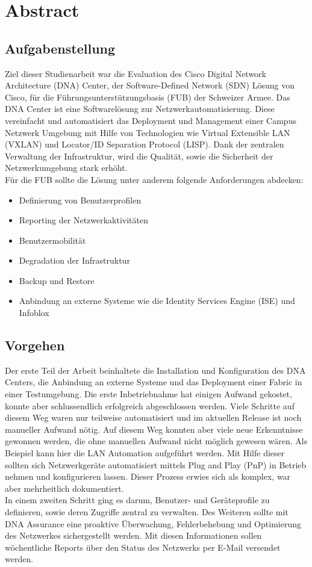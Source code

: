 \section{Abstract} 

\subsection{Aufgabenstellung} \label{Abstract}
Ziel dieser Studienarbeit war die Evaluation des Cisco Digital Network Architecture (DNA) Center, der Software-Defined Network (SDN) Lösung von Cisco, für die Führungsunterstützungsbasis (FUB) der Schweizer Armee. Das DNA Center ist eine Softwarelösung zur Netzwerkautomatisierung. Diese vereinfacht und automatisiert das Deployment und Management einer Campus Netzwerk Umgebung mit Hilfe von Technologien wie Virtual Extensible LAN (VXLAN) und Locator/ID Separation Protocol (LISP). Dank der zentralen Verwaltung der Infrastruktur, wird die Qualität, sowie die Sicherheit der Netzwerkumgebung stark erhöht.\\
Für die FUB sollte die Lösung unter anderem folgende Anforderungen abdecken:
\begin{itemize}
	\item Definierung von Benutzerprofilen
	\item Reporting der Netzwerkaktivitäten
	\item Benutzermobilität
	\item Degradation der Infrastruktur
	\item Backup und Restore
	\item Anbindung an externe Systeme wie die Identity Services Engine (ISE) und Infoblox
\end{itemize}

\subsection{Vorgehen}
Der erste Teil der Arbeit beinhaltete die Installation und Konfiguration des DNA Centers, die Anbindung an externe Systeme und das Deployment einer Fabric in einer Testumgebung. Die erste Inbetriebnahme hat einigen Aufwand gekostet, konnte aber schlussendlich erfolgreich abgeschlossen werden. Viele Schritte auf diesem Weg waren nur teilweise automatisiert und im aktuellen Release ist noch manueller Aufwand nötig. Auf diesem Weg konnten aber viele neue Erkenntnisse gewonnen werden, die ohne manuellen Aufwand nicht möglich gewesen wären. Als Beispiel kann hier die LAN Automation aufgeführt werden. Mit Hilfe dieser sollten sich Netzwerkgeräte automatisiert mittels Plug and Play (PnP) in Betrieb nehmen und konfigurieren lassen. Dieser Prozess erwies sich als komplex, war aber mehrheitlich dokumentiert. \\
In einem zweiten Schritt ging es darum, Benutzer- und Geräteprofile zu definieren, sowie deren Zugriffe zentral zu verwalten. Des Weiteren sollte mit DNA Assurance eine proaktive Überwachung, Fehlerbehebung und Optimierung des Netzwerkes sichergestellt werden. Mit diesen Informationen sollen wöchentliche Reports über den Status des Netzwerks per E-Mail versendet werden.

